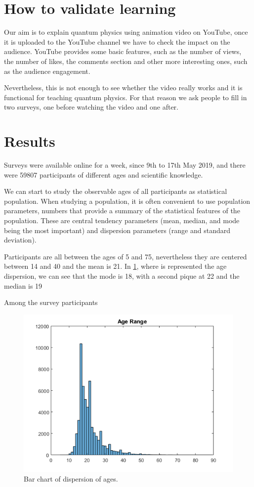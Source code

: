 \documentclass[final,a4paper,10pt]{article}
\numberwithin{equation}{section}
\numberwithin{figure}{section}
\numberwithin{table}{section}
\begin{document}
\section{How to validate learning}
Our aim is to explain quantum physics using animation video on YouTube, once it is uploaded to the YouTube channel we have to check the impact on the audience. YouTube provides some basic features, such as the number of views, the number of likes, the comments section and other more interesting ones, such as the audience engagement.

Nevertheless, this is not enough to see whether the video really works and it is functional for teaching quantum physics. For that reason we ask people to fill in two surveys, one before watching the video and one after. 

\section{Results}
Surveys were available online for a week, since 9th to 17th May 2019, and there were 59807 participants of different ages and scientific knowledge. 

We can start to study the observable ages of all participants as statistical population. When studying a population, it is often convenient to use population parameters, numbers that provide a summary of the statistical features of the population. These are central tendency parameters (mean, median, and mode being the most important) and dispersion parameters (range and standard deviation).

Participants are all between the ages of 5 and 75, nevertheless they are centered between 14 and 40 and the mean is 21. In \ref{fig:age}, where is represented the age dispersion, we can see that the mode is 18, with a second pique at 22 and the median is 19



Among the survey participants
\begin{figure}[H]
    \begin{center}
        \includegraphics[scale=0.6]{Ages_V1.png}
    \end{center}
    \caption{\footnotesize Bar chart of dispersion of ages.}
    \label{fig:age}
\end{figure}
\end{document}
